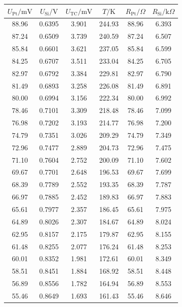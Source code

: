\documentclass[a4paper,fontset=windows]{ctexart}
\begin{document}
{\small
\begin{center}
    \begin{longtable}{cccccc}
        \toprule[0.1em]
        $U_\mathrm{Pt}/\mathrm{mV}$ & $U_\mathrm{Si}/\mathrm{V}$ & $U_\mathrm{TC}/\mathrm{mV}$ & $T/\mathrm{K}$ & $R_\mathrm{Pt}/\Omega$ & $R_\mathrm{Si}/\mathrm{k}\Omega$ \\
        \midrule[0.06em]
        88.96 & 0.6395 & 3.901 & 244.93 & 88.96 & 6.393 \\
        87.24 & 0.6509 & 3.739 & 240.59 & 87.24 & 6.507 \\
        85.84 & 0.6601 & 3.621 & 237.05 & 85.84 & 6.599 \\
        84.25 & 0.6707 & 3.511 & 233.04 & 84.25 & 6.705 \\
        82.97 & 0.6792 & 3.384 & 229.81 & 82.97 & 6.790 \\
        81.49 & 0.6893 & 3.258 & 226.08 & 81.49 & 6.891 \\
        80.00 & 0.6994 & 3.156 & 222.34 & 80.00 & 6.992 \\
        78.46 & 0.7101 & 3.309 & 218.48 & 78.46 & 7.099 \\
        76.98 & 0.7202 & 3.193 & 214.77 & 76.98 & 7.200 \\
        74.79 & 0.7351 & 3.026 & 209.29 & 74.79 & 7.349 \\
        72.96 & 0.7477 & 2.889 & 204.73 & 72.96 & 7.475 \\
        71.10 & 0.7604 & 2.752 & 200.09 & 71.10 & 7.602 \\
        69.67 & 0.7701 & 2.648 & 196.53 & 69.67 & 7.699 \\
        68.39 & 0.7789 & 2.552 & 193.35 & 68.39 & 7.787 \\
        66.97 & 0.7885 & 2.452 & 189.83 & 66.97 & 7.883 \\
        65.61 & 0.7977 & 2.357 & 186.45 & 65.61 & 7.975 \\
        64.89 & 0.8026 & 2.307 & 184.67 & 64.89 & 8.024 \\
        62.95 & 0.8157 & 2.175 & 179.87 & 62.95 & 8.155 \\
        61.48 & 0.8255 & 2.077 & 176.24 & 61.48 & 8.253 \\
        60.01 & 0.8352 & 1.981 & 172.61 & 60.01 & 8.349 \\
        58.51 & 0.8451 & 1.884 & 168.92 & 58.51 & 8.448 \\
        56.89 & 0.8556 & 1.782 & 164.94 & 56.89 & 8.553 \\
        55.46 & 0.8649 & 1.693 & 161.43 & 55.46 & 8.646 \\

\end{longtable}
\end{center}}
\end{document}
